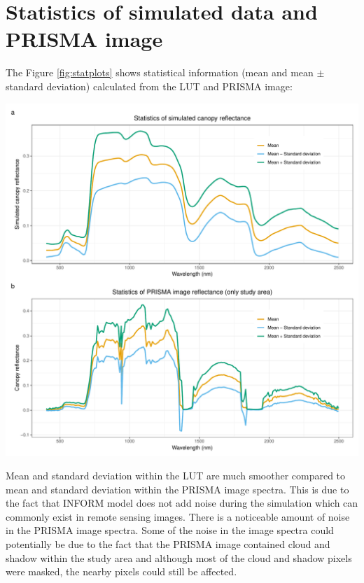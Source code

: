 \documentclass[a4paper, twoside]{templates/ociamthesis}
\let\origfigure\figure
\let\endorigfigure\endfigure
\renewenvironment{figure}[1][2] {
    \expandafter\origfigure\expandafter[H]
} {
    \endorigfigure
}
\begin{document}
\hypertarget{statistics-of-simulated-data-and-prisma-image-1}{%
\section{Statistics of simulated data and PRISMA image}\label{statistics-of-simulated-data-and-prisma-image-1}}

The Figure \ref{fig:statplots} shows statistical information (mean and mean \(\pm\) standard deviation) calculated from the LUT and PRISMA image:

\begin{figure}
\includegraphics[width=0.9\linewidth]{./figures/stats} \caption{Mean and mean $\pm$ standard deviation in the a) LUT and b) PRISMA image}\label{fig:statplots}
\end{figure}

Mean and standard deviation within the LUT are much smoother compared to mean and standard deviation within the PRISMA image spectra. This is due to the fact that INFORM model does not add noise during the simulation which can commonly exist in remote sensing images. There is a noticeable amount of noise in the PRISMA image spectra. Some of the noise in the image spectra could potentially be due to the fact that the PRISMA image contained cloud and shadow within the study area and although most of the cloud and shadow pixels were masked, the nearby pixels could still be affected.
\end{document}
